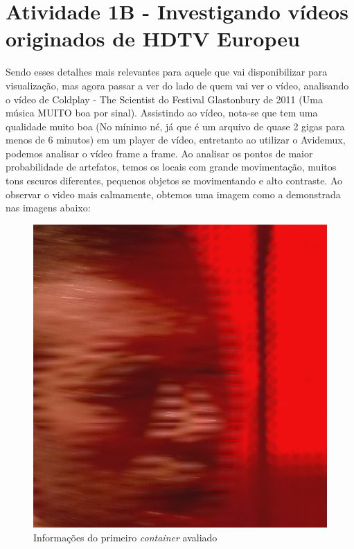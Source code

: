 \section{Atividade 1B - Investigando vídeos originados de HDTV Europeu}

Sendo esses detalhes mais relevantes para aquele que vai disponibilizar para visualização, mas agora passar a ver do lado de quem vai ver o vídeo, analisando o vídeo de Coldplay - The Scientist do Festival Glastonbury de 2011 (Uma música MUITO boa por sinal).
\paragrafo Assistindo ao vídeo, nota-se que tem uma qualidade muito boa (No mínimo né, já que é um arquivo de quase 2 gigas para menos de 6 minutos) em um player de vídeo, entretanto ao utilizar o Avidemux, podemos analisar o vídeo frame a frame.
\paragrafo Ao analisar os pontos de maior probabilidade de artefatos, temos os locais com grande movimentação, muitos tons escuros diferentes, pequenos objetos se movimentando e alto contraste.
Ao observar o video mais calmamente, obtemos uma imagem como a demonstrada nas imagens abaixo:

\begin{figure}[H]
    \centering
    \caption{Informações do primeiro \textit{container} avaliado}
    \label{fig:imagem5}
    \includegraphics[scale=0.5]{Documeto/1-ElementosTextuais/images/05.png}
    
    \autoriaPropria
\end{figure}

